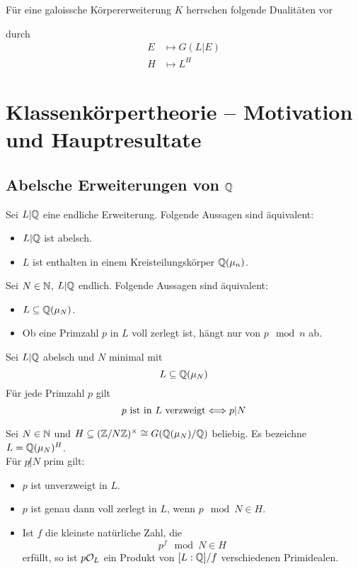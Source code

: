 \documentclass{book}
\begin{document}
Für eine galoissche Körpererweiterung  $K$ herrschen folgende Dualitäten vor
\begin{center}
\end{center}
durch
\begin{align*}
E & \longmapsto G(L|E)\\
H & \longmapsto L^H
\end{align*}



\chapter{Klassenkörpertheorie -- Motivation und Hauptresultate}
\section{Abelsche Erweiterungen von $\mathbb{Q}$}
Sei $L|\mathbb{Q}$ eine endliche Erweiterung. Folgende Aussagen sind äquivalent:
\begin{itemize}
	\item $L|\mathbb{Q}$ ist abelsch.
	\item $L$ ist enthalten in einem Kreisteilungskörper $\mathbb{Q}(\mu_n)$.
\end{itemize}

\Satz{}
Sei $N \in \mathbb{N}$, $L |\mathbb{Q}$ endlich. Folgende Aussagen sind äquivalent:
\begin{itemize}
	\item $L \subseteq \mathbb{Q}(\mu_N)$.
	\item Ob eine Primzahl $p$ in $L$ voll zerlegt ist, hängt nur von $p\mod{n}$ ab.
\end{itemize}

\Satz{}
Sei $L|\mathbb{Q}$ abelsch und $N$ minimal mit
\[ L \subseteq \mathbb{Q}(\mu_N) \]
Für jede Primzahl $p$ gilt
\[ p \text{ ist in }L \text{ verzweigt} \overset{}{\Longleftrightarrow} p|N \]

\Satz{}
Sei $N \in \mathbb{N}$ und $H \subseteq (\mathbb{Z}/N\mathbb{Z})^\times \overset{}{\cong} G(\mathbb{Q}(\mu_N) / \mathbb{Q})$ beliebig. Es bezeichne $L = \mathbb{Q}(\mu_N)^H$.\\
Für $p\not | N$ prim gilt:
\begin{itemize}
	\item $p$ ist unverzweigt in $L$.
	\item $p$ ist genau dann voll zerlegt in $L$, wenn $p\mod{N} \in H$.
	\item Ist $f$ die kleinste natürliche Zahl, die
	\[ p^f \mod{N} \in H \]
	erfüllt, so ist $p\mathcal{O}_L$ ein Produkt von $[L:\mathbb{Q}]/f$ verschiedenen Primidealen. 
\end{itemize}
\end{document}
